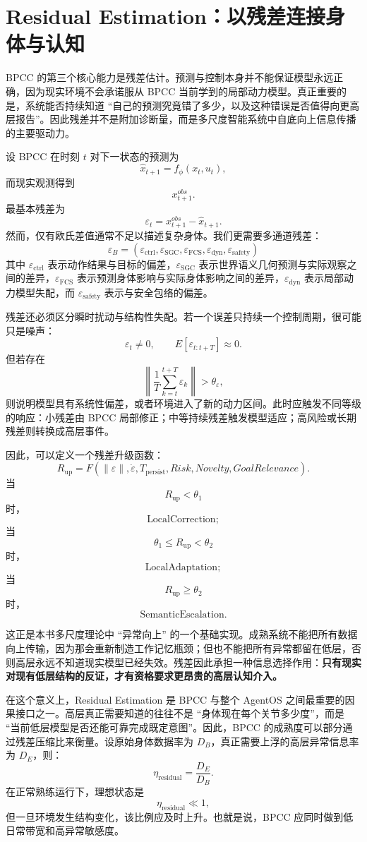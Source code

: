 \section{Residual Estimation：以残差连接身体与认知}

BPCC 的第三个核心能力是残差估计。预测与控制本身并不能保证模型永远正确，因为现实环境不会承诺服从 BPCC 当前学到的局部动力模型。真正重要的是，系统能否持续知道 ``自己的预测究竟错了多少，以及这种错误是否值得向更高层报告''。因此残差并不是附加诊断量，而是多尺度智能系统中自底向上信息传播的主要驱动力。

设 BPCC 在时刻 $t$ 对下一状态的预测为
\[
\hat x_{t+1}
=
f_\phi(x_t,u_t),
\]
而现实观测得到
\[
x_{t+1}^{obs}.
\]
最基本残差为
\[
\varepsilon_t
=
x_{t+1}^{obs}
-
\hat x_{t+1}.
\]
然而，仅有欧氏差值通常不足以描述复杂身体。我们更需要多通道残差：
\[
\boxed{
\varepsilon_B
=
(
\varepsilon_{\mathrm{ctrl}},
\varepsilon_{\mathrm{SGC}},
\varepsilon_{\mathrm{FCS}},
\varepsilon_{\mathrm{dyn}},
\varepsilon_{\mathrm{safety}}
)
}
\]
其中 $\varepsilon_{\mathrm{ctrl}}$ 表示动作结果与目标的偏差，$\varepsilon_{\mathrm{SGC}}$ 表示世界语义几何预测与实际观察之间的差异，$\varepsilon_{\mathrm{FCS}}$ 表示预测身体影响与实际身体影响之间的差异，$\varepsilon_{\mathrm{dyn}}$ 表示局部动力模型失配，而 $\varepsilon_{\mathrm{safety}}$ 表示与安全包络的偏差。

残差还必须区分瞬时扰动与结构性失配。若一个误差只持续一个控制周期，很可能只是噪声：
\[
\varepsilon_t\neq0,
\qquad
E[\varepsilon_{t:t+T}]\approx0.
\]
但若存在
\[
\left\|
\frac{1}{T}
\sum_{k=t}^{t+T}
\varepsilon_k
\right\|
>\theta_\varepsilon,
\]
则说明模型具有系统性偏差，或者环境进入了新的动力区间。此时应触发不同等级的响应：小残差由 BPCC 局部修正；中等持续残差触发模型适应；高风险或长期残差则转换成高层事件。

因此，可以定义一个残差升级函数：
\[
R_{\mathrm{up}}
=
F(
\|\varepsilon\|,
\dot{\varepsilon},
T_{\mathrm{persist}},
Risk,
Novelty,
GoalRelevance
).
\]
当
\[
R_{\mathrm{up}}<\theta_1
\]
时，
\[
\text{LocalCorrection};
\]
当
\[
\theta_1\leq R_{\mathrm{up}}<\theta_2
\]
时，
\[
\text{LocalAdaptation};
\]
当
\[
R_{\mathrm{up}}\geq\theta_2
\]
时，
\[
\text{SemanticEscalation}.
\]

这正是本书多尺度理论中 ``异常向上'' 的一个基础实现。成熟系统不能把所有数据向上传输，因为那会重新制造工作记忆瓶颈；但也不能把所有异常都留在低层，否则高层永远不知道现实模型已经失效。残差因此承担一种信息选择作用：\textbf{只有现实对现有低层结构的反证，才有资格要求更昂贵的高层认知介入。}

在这个意义上，Residual Estimation 是 BPCC 与整个 AgentOS 之间最重要的因果接口之一。高层真正需要知道的往往不是 ``身体现在每个关节多少度''，而是 ``当前低层模型是否还能可靠完成既定意图''。因此，BPCC 的成熟度可以部分通过残差压缩比来衡量。设原始身体数据率为 $D_B$，真正需要上浮的高层异常信息率为 $D_E$，则：
\[
\eta_{\mathrm{residual}}
=
\frac{D_E}{D_B}.
\]
在正常熟练运行下，理想状态是
\[
\eta_{\mathrm{residual}}\ll1,
\]
但一旦环境发生结构变化，该比例应及时上升。也就是说，BPCC 应同时做到低日常带宽和高异常敏感度。


